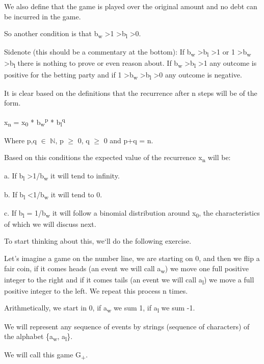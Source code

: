 \documentclass[12pt,reqno]{amsart}
\begin{document}
We also define that the game is played over the original amount and no debt can be incurred in the game.

So another condition is that b\textsubscript{w} \textgreater 1 \textgreater b\textsubscript{l} \textgreater 0.

Sidenote (this should be a commentary at the bottom): If b\textsubscript{w} \textgreater b\textsubscript{l} \textgreater 1 or 1 \textgreater b\textsubscript{w} \textgreater b\textsubscript{l} there is nothing to prove or even reason about. If b\textsubscript{w} \textgreater b\textsubscript{l} \textgreater 1 any outcome is positive for the betting party and if 1 \textgreater b\textsubscript{w} \textgreater b\textsubscript{l} \textgreater 0 any outcome is negative. 

It is clear based on the definitions that the recurrence after n steps will be of the form.

x\textsubscript{n} = x\textsubscript{0} * b\textsubscript{w}\textsuperscript{p} * b\textsubscript{l}\textsuperscript{q}

Where p,q $\in$ $\mathbb{N}$, p $\geq$ 0, q $\geq$ 0 and p+q = n.  

Based on this conditions the expected value of the recurrence x\textsubscript{n} will be:

a. If b\textsubscript{l} \textgreater 1/b\textsubscript{w} it will tend to infinity.

b. If b\textsubscript{l} \textless 1/b\textsubscript{w} it will tend to 0.

c. If b\textsubscript{l} = 1/b\textsubscript{w} it will follow a binomial distribution around x\textsubscript{0}, the characteristics of which we will discuss next.

To start thinking about this, we`ll do the following exercise. 

Let's imagine a game on the number line, we are starting on 0, and then we flip a fair coin, if it comes heads (an event we will call a\textsubscript{w}) we move one full positive integer to the right and if it comes tails (an event we will call a\textsubscript{l}) we move a full positive integer to the left. We repeat this process n times.

Arithmetically, we start in 0, if a\textsubscript{w} we sum 1, if a\textsubscript{l} we sum -1.

We will represent any sequence of events by strings (sequence of characters) of the alphabet \{a\textsubscript{w}, a\textsubscript{l}\}. 

We will call this game G\textsubscript{+}.
\end{document}
